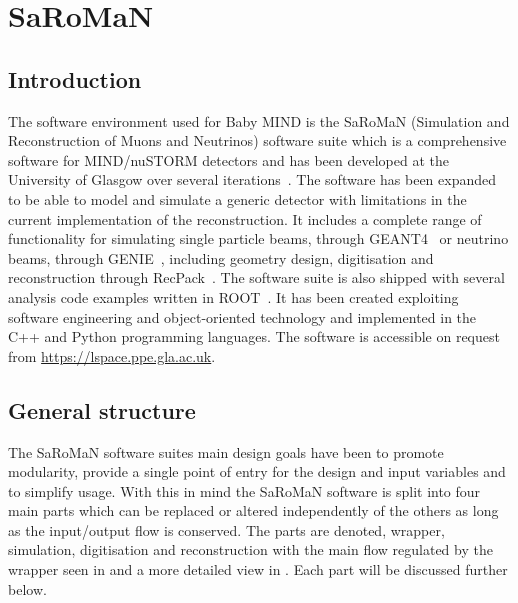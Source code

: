 \chapter{SaRoMaN}
\label{c:software}

\section{Introduction}

The software environment used for Baby MIND is the SaRoMaN (Simulation and Reconstruction of Muons and Neutrinos) software suite which is a comprehensive software for MIND/nuSTORM detectors and has been developed at the University of Glasgow over several iterations~\cite{27Bross,  53Laing, 54NUFACT2016Hallsjo}. The software has been expanded to be able to model and simulate a generic detector with limitations in the current implementation of the reconstruction. It includes a complete range of functionality for simulating single particle beams, through GEANT4~\cite{Geant4} or neutrino beams, through GENIE~\cite{Genie}, including geometry design, digitisation and reconstruction through RecPack~\cite{RecPack}. The software suite is also shipped with several analysis code examples written in ROOT~\cite{Root}. It has been created exploiting software engineering and object-oriented technology and implemented in the C++ and Python programming languages. The software is accessible on request from \url{https://lspace.ppe.gla.ac.uk}. 

\section{General structure}
The SaRoMaN software suites main design goals have been to promote modularity, provide a single point of entry for the design and input variables and to simplify usage. With this in mind the SaRoMaN software is split into four main parts which can be replaced or altered independently of the others as long as the input/output flow is conserved. The parts are denoted, wrapper, simulation, digitisation and reconstruction with the main flow regulated by the wrapper seen in  and a more detailed view in . Each part will be discussed further below.

